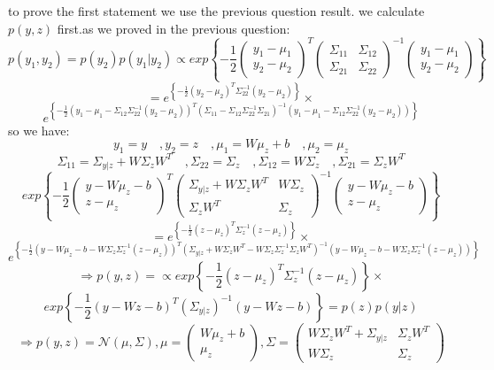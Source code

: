 \begin{qsolve}
	\begin{qsolve}[]
		to prove the first statement we use the previous question result. we calculate $p(y,z)$ first.as we proved in the previous question:
		$$p(y_1 , y_2) = p(y_2)p(y_1|y_2) \propto exp\left\{-\dfrac{1}{2} \begin{pmatrix} y_1 - \mu_1 \\ y_2 - \mu_2 \end{pmatrix}^T \begin{pmatrix} \Sigma_{11} & \Sigma_{12} \\ \Sigma_{21} & \Sigma_{22} \end{pmatrix}^{-1} \begin{pmatrix} y_1 - \mu_1 \\ y_2 - \mu_2 \end{pmatrix}\right\}$$
		$$ = e^{\left\{-\frac{1}{2} (y_2 - \mu_2)^T \Sigma_{22}^{-1} (y_2 - \mu_2) \right\}}\times$$
		$$ e^{\left\{-\frac{1}{2} (y_1 - \mu_1 - \Sigma_{12}\Sigma_{22}^{-1}(y_2 - \mu_2))^T (\Sigma_{11} - \Sigma_{12}\Sigma_{22}^{-1}\Sigma_{21})^{-1} (y_1 - \mu_1 - \Sigma_{12}\Sigma_{22}^{-1}(y_2 - \mu_2)) \right\}}$$
		so we have:
		$$y_1 = y\quad, y_2 = z\quad, \mu_1 = W\mu_z + b\quad, \mu_2 = \mu_z$$
		$$ \Sigma_{11} = \Sigma_{y|z} + W\Sigma_zW^T\quad, \Sigma_{22} = \Sigma_z\quad, \Sigma_{12} = W \Sigma_z \quad, \Sigma_{21} = \Sigma_z W^T$$
		\splitqsolve[\splitqsolve]
		$$exp\left\{-\dfrac{1}{2} \begin{pmatrix} y - W\mu_z - b \\ z - \mu_z \end{pmatrix}^T \begin{pmatrix} \Sigma_{y|z} + W\Sigma_zW^T & W\Sigma_z \\ \Sigma_zW^T & \Sigma_z \end{pmatrix}^{-1} \begin{pmatrix} y - W\mu_z - b \\ z - \mu_z \end{pmatrix}\right\}$$
		$$= e^{\left\{-\frac{1}{2} (z - \mu_z)^T \Sigma_z^{-1} (z - \mu_z) \right\}}\times$$
		$$ e^{\left\{-\frac{1}{2} (y - W\mu_z - b - W\Sigma_z\Sigma_z^{-1}(z - \mu_z))^T (\Sigma_{y|z} + W\Sigma_zW^T - W\Sigma_z\Sigma_z^{-1}\Sigma_zW^T)^{-1} (y - W\mu_z - b - W\Sigma_z\Sigma_z^{-1}(z - \mu_z)) \right\}}$$
		$$\Rightarrow p(y,z) =\propto exp\left\{-\dfrac{1}{2} (z-\mu_z)^T \Sigma_z^{-1} (z-\mu_z)\right\}\times$$
		$$ exp\left\{-\dfrac{1}{2} (y - Wz - b)^T (\Sigma_{y|z})^{-1} (y - Wz - b)\right\} = p(z)p(y|z)$$
		$$\Rightarrow p(y,z) = \mathcal{N}(\mu , \Sigma) , \mu = \begin{pmatrix}W \mu_z + b \\ \mu_z\end{pmatrix} , \Sigma = \begin{pmatrix}W\Sigma_zW^T + \Sigma_{y|z} & \Sigma_zW^T \\ W\Sigma_z & \Sigma_z\end{pmatrix}$$

\end{qsolve}
\end{qsolve}
